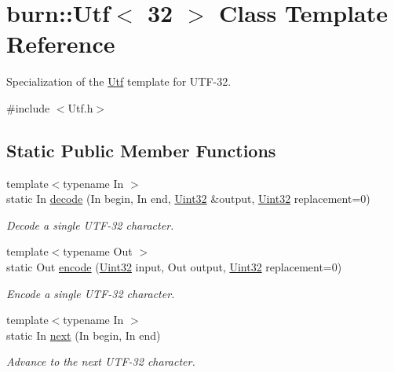 \hypertarget{classburn_1_1_utf_3_0132_01_4}{\section{burn\-:\-:Utf$<$ 32 $>$ Class Template Reference}
\label{classburn_1_1_utf_3_0132_01_4}
}


Specialization of the \hyperlink{classburn_1_1_utf}{Utf} template for U\-T\-F-\/32.  




{\ttfamily \#include $<$Utf.\-h$>$}

\subsection*{Static Public Member Functions}
\begin{DoxyCompactItemize}
\item 
{\footnotesize template$<$typename In $>$ }\\static In \hyperlink{classburn_1_1_utf_3_0132_01_4_a0d8a41685e2b96c1e66f1ad90d199e42}{decode} (In begin, In end, \hyperlink{namespaceburn_ab40b09022209bd449d317c1f0e95356b}{Uint32} \&output, \hyperlink{namespaceburn_ab40b09022209bd449d317c1f0e95356b}{Uint32} replacement=0)
\begin{DoxyCompactList}\small\item\em Decode a single U\-T\-F-\/32 character. \end{DoxyCompactList}\item 
{\footnotesize template$<$typename Out $>$ }\\static Out \hyperlink{classburn_1_1_utf_3_0132_01_4_a122bf45ef0731385764246f6752f59f4}{encode} (\hyperlink{namespaceburn_ab40b09022209bd449d317c1f0e95356b}{Uint32} input, Out output, \hyperlink{namespaceburn_ab40b09022209bd449d317c1f0e95356b}{Uint32} replacement=0)
\begin{DoxyCompactList}\small\item\em Encode a single U\-T\-F-\/32 character. \end{DoxyCompactList}\item 
{\footnotesize template$<$typename In $>$ }\\static In \hyperlink{classburn_1_1_utf_3_0132_01_4_a89678514c5856b08d8871f9b12711d7e}{next} (In begin, In end)
\begin{DoxyCompactList}\small\item\em Advance to the next U\-T\-F-\/32 character. \end{DoxyCompactList}\item 

\end{DoxyCompactItemize}
